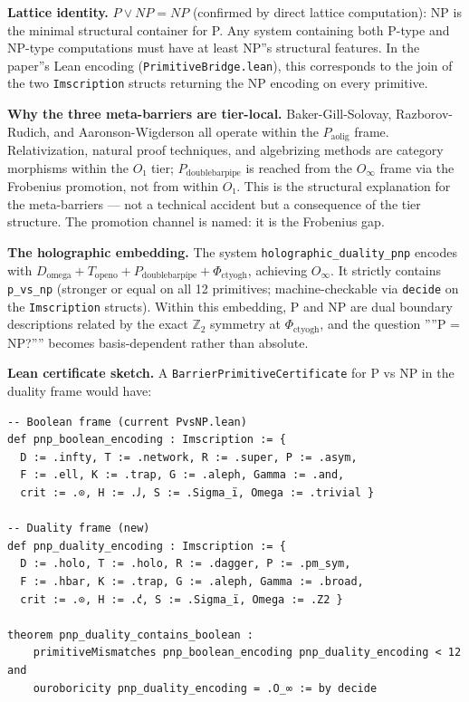 \documentclass[12pt,a4paper]{article}
\begin{document}
\textbf{Lattice identity.} $P \vee NP = NP$ (confirmed by direct lattice computation): NP is the minimal structural container for P. Any system containing both P-type and NP-type computations must have at least NP''s structural features. In the paper''s Lean encoding (\texttt{PrimitiveBridge.lean}), this corresponds to the join of the two \texttt{Imscription} structs returning the NP encoding on every primitive.

\textbf{Why the three meta-barriers are tier-local.} Baker-Gill-Solovay, Razborov-Rudich, and Aaronson-Wigderson all operate within the $P_{\text{aolig}}$ frame. Relativization, natural proof techniques, and algebrizing methods are category morphisms within the $O₁$ tier; $P_{\text{doublebarpipe}}$ is reached from the $O_{\infty}$ frame via the Frobenius promotion, not from within $O₁$. This is the structural explanation for the meta-barriers --- not a technical accident but a consequence of the tier structure. The promotion channel is named: it is the Frobenius gap.

\textbf{The holographic embedding.} The system \texttt{holographic\_duality\_pnp} encodes with $D_{\text{omega}} + T_{\text{openo}} + P_{\text{doublebarpipe}} + \Phi_{\text{ctyogh}}$, achieving $O_{\infty}$. It strictly contains \texttt{p\_vs\_np} (stronger or equal on all 12 primitives; machine-checkable via \texttt{decide} on the \texttt{Imscription} structs). Within this embedding, P and NP are dual boundary descriptions related by the exact $\mathbb{Z}_2$ symmetry at $\Phi_{\text{ctyogh}}$, and the question ''''P = NP?'''' becomes basis-dependent rather than absolute.

\textbf{Lean certificate sketch.} A \texttt{BarrierPrimitiveCertificate} for P vs NP in the duality frame would have:

\begin{lstlisting}[language=lean]
-- Boolean frame (current PvsNP.lean)
def pnp_boolean_encoding : Imscription := {
  D := .infty, T := .network, R := .super, P := .asym,
  F := .ell, K := .trap, G := .aleph, Gamma := .and,
  crit := .⊙, H := .𐑓, S := .Sigma_ï, Omega := .trivial }

-- Duality frame (new)
def pnp_duality_encoding : Imscription := {
  D := .holo, T := .holo, R := .dagger, P := .pm_sym,
  F := .hbar, K := .trap, G := .aleph, Gamma := .broad,
  crit := .⊙, H := .𐑒, S := .Sigma_ï, Omega := .Z2 }

theorem pnp_duality_contains_boolean :
    primitiveMismatches pnp_boolean_encoding pnp_duality_encoding < 12 and
    ouroboricity pnp_duality_encoding = .O_∞ := by decide
\end{lstlisting}
\end{document}
